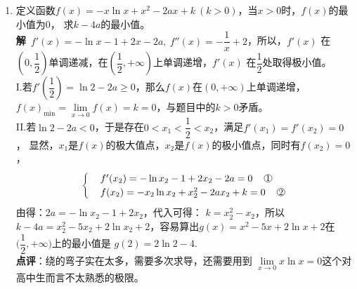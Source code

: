 \begin{enumerate}[label={【\textbf{例\thechapter.\arabic*}】},
 leftmargin=\inteval{\myenumleftmargin}pt,
 itemsep=\inteval{\myenumitempsep}pt,
 itemindent=\inteval{\myenumitemindent}pt]
\item 定义函数$ f(x)=-x\ln x+x^2-2ax+k \ (k>0) $，当$ x>0 $时，$ f(x) $的最小值为0，
求$ k-4a $的最小值。\\
\textbf{解}\ $ f'(x)=-\ln x-1+2x-2a,\ f''(x)=-\dfrac{1}{x}+2 $，所以，$ f'(x) $
在$ (0,\dfrac{1}{2}) $单调递减，在$ (\dfrac{1}{2},+\infty) $上单调递增，$ f'(x) $
在$ \dfrac{1}{2} $处取得极小值。\\
I.若$ f'(\dfrac{1}{2})=\ln2-2a\geq 0 $，那么$ f(x) $在$ (0,+\infty) $上单调递增，
$ f(x)_{\min}=\lim\limits_{x\to 0}f(x)=k=0 $，与题目中的$ k>0 $矛盾。\\
II.若$ \ln2-2a < 0 $，于是存在$ 0<x_1<\dfrac{1}{2}<x_2 $，满足$ f'(x_1)=f'(x_2)=0 $，
显然，$ x_1 $是$ f(x) $的极大值点，$ x_2 $是$ f(x) $的极小值点，同时有$ f(x_2)=0 $，
\begin{align*}
    \begin{cases}
        & f'(x_2)=-\ln x_2-1+2x_2-2a=0  \quad\mycircled{1} \\
        & f(x_2)=-x_2\ln x_2+x_2^2-2ax_2+k=0 \quad\mycircled{2}
    \end{cases}
\end{align*}
由得：$ 2a=-\ln x_2-1+2x_2 $，代入可得：
$ k=x_2^2-x_2 $，所以$ k-4a=x_2^2-5x_2+2\ln x_2+2 $，容易算出$ g(x)=x^2-5x+
2\ln x+2 $在$ \Big(\dfrac{1}{2},+\infty\Big) $上的最小值是
$ g(2)=2\ln 2-4 $. \\
\textbf{点评}：绕的弯子实在太多，需要多次求导，还需要用到
$ \lim\limits_{x\to 0} x\ln x=0 $这个对高中生而言不太熟悉的极限。\\

\end{enumerate}
\cleardoublepage
%

